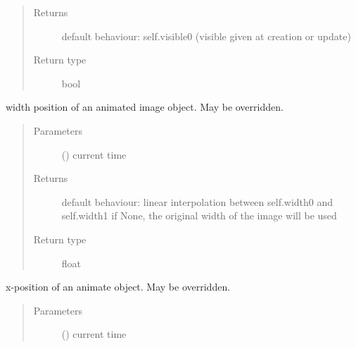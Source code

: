 \documentclass[letterpaper,10pt,english]{sphinxmanual}
\begin{document}
\begin{fulllineitems}
\begin{fulllineitems}
\begin{quote}
\begin{description}
\item[{Returns}] \leavevmode
{} \textendash{} default behaviour: self.visible0 (visible given at creation or update)

\item[{Return type}] \leavevmode
bool

\end{description}\end{quote}

\end{fulllineitems}


\begin{fulllineitems}
\label{\detokenize{Reference:salabim.Animate.width}}
width position of an animated image object. May be overridden.
\begin{quote}\begin{description}
\item[{Parameters}] \leavevmode
{} () \textendash{} current time

\item[{Returns}] \leavevmode
{} \textendash{} default behaviour: linear interpolation between self.width0 and self.width1 
if None, the original width of the image will be used

\item[{Return type}] \leavevmode
float

\end{description}\end{quote}

\end{fulllineitems}


\begin{fulllineitems}
\label{\detokenize{Reference:salabim.Animate.x}}
x-position of an animate object. May be overridden.
\begin{quote}\begin{description}
\item[{Parameters}] \leavevmode
{} () \textendash{} current time


\end{description}
\end{quote}
\end{fulllineitems}
\end{fulllineitems}
\end{document}

